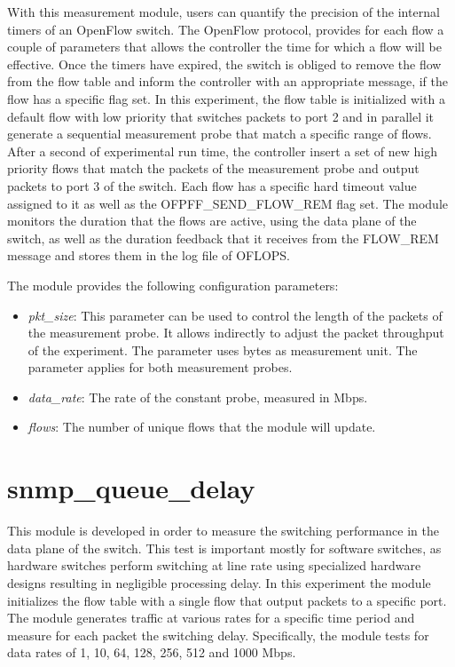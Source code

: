 \documentclass{book}
\begin{document}
  With this measurement module, users can quantify the precision of the internal
  timers of an OpenFlow switch. The OpenFlow protocol, provides for each flow a
  couple of parameters that allows the controller the time for which a flow will be
  effective. Once the timers have expired, the switch is obliged to remove the
  flow from the flow table and inform the controller with an appropriate 
  message, if the flow has a specific flag set. In this experiment, the flow table is
  initialized with a default flow with low priority that switches packets to port
  2 and in parallel it generate a sequential measurement probe that match a specific
  range of flows. After a second of experimental run time, the controller insert a
  set of new high priority flows that match the packets of the measurement probe 
  and output packets to port 3 of the switch. Each flow has a specific hard timeout 
  value assigned to it as well as the OFPFF\_SEND\_FLOW\_REM flag set. The module monitors 
  the duration that the flows are active, using the data plane of the switch, as 
  well as the duration feedback that it receives from the FLOW\_REM message and
  stores them in the log file of OFLOPS. 

  The module provides the following configuration parameters:
  \begin{itemize}
  \item \emph{pkt\_size}: This parameter can be used to control the length of the
  packets of the measurement probe. It allows indirectly to adjust the packet
  throughput of the experiment. The parameter uses bytes as measurement unit.
  The parameter applies for both measurement probes.
  \item \emph{data\_rate}: The rate of the constant probe, measured in Mbps.
  \item \emph{flows}:  The number of unique flows that the module will
  update.
  \end{itemize}

  \section{snmp\_queue\_delay}

  This module is developed in order to measure the switching performance in the
  data plane of the switch. This test is important mostly for software
  switches, as hardware switches perform switching at line rate using
  specialized hardware designs resulting in negligible processing delay. 
  In this experiment the module initializes the flow table with a single
  flow that output packets to a specific port. The module generates traffic at
  various rates for a specific time period and measure for each packet the switching delay. 
  Specifically, the module tests for data rates of 1, 10, 64, 128, 256, 512 and 1000 Mbps.
\end{document}
